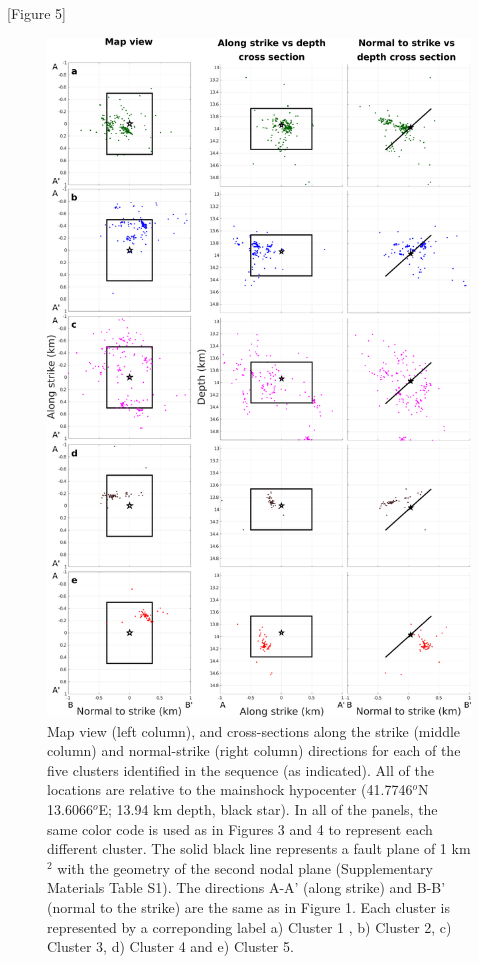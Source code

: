 \documentclass[a4paper,12pt,twoside]{article}
\begin{document}
\begin{center}
   [Figure 5]
\end{center}

\begin{figure}
    \centering
     \includegraphics[width=0.8\linewidth]{maps_clusters.pdf}     
     \caption{Map view (left column), and cross-sections along the strike (middle column) and normal-strike (right column) directions for each of the five clusters identified in the sequence (as indicated). All of the locations are relative to the mainshock hypocenter (41.7746$^o$N 13.6066$^o$E; 13.94 km depth, black star). In all of the panels, the same color code is used as in Figures 3 and 4 to represent each different cluster. The solid black line represents a fault plane of 1 km$^2$ with the geometry of the second nodal plane (Supplementary Materials Table S1). The directions A-A' (along strike) and B-B' (normal to the strike) are the same as in Figure 1. Each cluster is represented by a correponding label a) Cluster 1 , b) Cluster 2, c) Cluster 3, d) Cluster 4 and e) Cluster 5.}
\end{figure}          \label{fig:maps_each_cluster}
\end{document}
